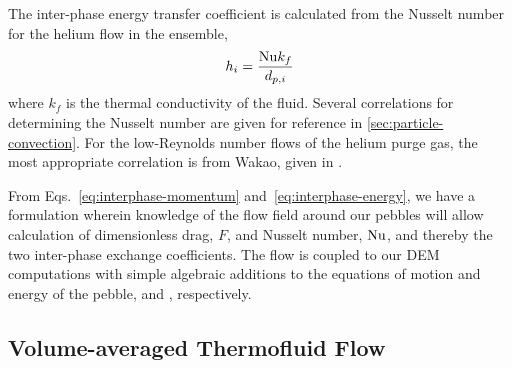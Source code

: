 The inter-phase energy transfer coefficient is calculated from the Nusselt number for the helium flow in the ensemble,
\begin{equation}\label{eq:interphase-energy}
	h_i = \frac{\mathrm{Nu} k_f}{d_{p,i}}
\end{equation}
where $k_f$ is the thermal conductivity of the fluid. Several correlations for determining the Nusselt number are given for reference in \cref{sec:particle-convection}. For the low-Reynolds number flows of the helium purge gas, the most appropriate correlation is from Wakao\etal, given in .


From Eqs.~\ref{eq:interphase-momentum} and~\ref{eq:interphase-energy}, we have a formulation wherein knowledge of the flow field around our pebbles will allow calculation of dimensionless drag, $F$, and Nusselt number, $\mathrm{Nu}$,  and thereby the two inter-phase exchange coefficients. The flow is coupled to our DEM computations with simple algebraic additions to the equations of motion and energy of the pebble,  and , respectively.




\subsection{Volume-averaged Thermofluid Flow}

